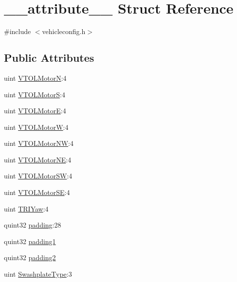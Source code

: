 \hypertarget{struct____attribute____}{\section{\-\_\-\-\_\-attribute\-\_\-\-\_\- \-Struct \-Reference}
\label{struct____attribute____}
}


{\ttfamily \#include $<$vehicleconfig.\-h$>$}

\subsection*{\-Public \-Attributes}
\begin{DoxyCompactItemize}
\item 
uint \hyperlink{group___config_plugin_ga2f7517413dcc58e5033f5b558c2645b6}{\-V\-T\-O\-L\-Motor\-N}\-:4
\item 
uint \hyperlink{group___config_plugin_ga454ee04b612bfb51636328cac0ecb30c}{\-V\-T\-O\-L\-Motor\-S}\-:4
\item 
uint \hyperlink{group___config_plugin_ga98abc446e1dcba498787f381659f6b2d}{\-V\-T\-O\-L\-Motor\-E}\-:4
\item 
uint \hyperlink{group___config_plugin_ga702b69e8ffd06d1a761e28540e0706c0}{\-V\-T\-O\-L\-Motor\-W}\-:4
\item 
uint \hyperlink{group___config_plugin_gaad074461234c2de58881eb8f2923e6e7}{\-V\-T\-O\-L\-Motor\-N\-W}\-:4
\item 
uint \hyperlink{group___config_plugin_gab2efff1f0b5cdb98443f986d78f75691}{\-V\-T\-O\-L\-Motor\-N\-E}\-:4
\item 
uint \hyperlink{group___config_plugin_ga6c7dfd25d7944b3ce84871fed9c6c9ef}{\-V\-T\-O\-L\-Motor\-S\-W}\-:4
\item 
uint \hyperlink{group___config_plugin_gaa954495952cf0b6ae1f8a25d95ca09c0}{\-V\-T\-O\-L\-Motor\-S\-E}\-:4
\item 
uint \hyperlink{group___config_plugin_ga63632c414ddd0db93282a775cff6ee2b}{\-T\-R\-I\-Yaw}\-:4
\item 
quint32 \hyperlink{group___config_plugin_gae439ab85c005f3400498997049fd50e8}{padding}\-:28
\item 
quint32 \hyperlink{group___config_plugin_ga1d4a76a1f0c36316d50d1ae3f788ef4e}{padding1}
\item 
quint32 \hyperlink{group___config_plugin_ga445d386b31eb43aafbd971345a5b221e}{padding2}
\item 
uint \hyperlink{group___config_plugin_ga4f96550cdd283e7bb8b8fb7ec7d3cc09}{\-Swashplate\-Type}\-:3

\end{DoxyCompactItemize}
